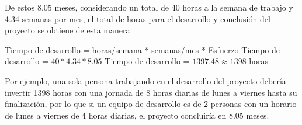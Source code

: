 De estos 8.05 meses, considerando un total de 40 horas a la semana de trabajo y 4.34 semanas por mes, el total de horas para el desarrollo y conclusión del proyecto se obtiene de esta manera:

\begin{center}
	Tiempo de desarrollo = horas/semana * semanas/mes * Esfuerzo
	Tiempo de desarrollo = $ 40 * 4.34 * 8.05 $
	Tiempo de desarrollo = $ 1397.48 \approx 1398 $ horas
\end{center}


Por ejemplo, una sola persona trabajando en el desarrollo del proyecto debería invertir 1398 horas con una jornada de 8 horas diarias de lunes a viernes hasta su finalización, por lo que si un equipo de desarrollo es de 2 personas con un horario de lunes a viernes de 4 horas diarias, el proyecto concluiría en 8.05 meses.

